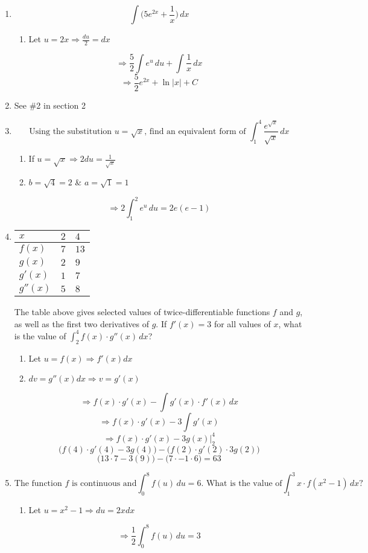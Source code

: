 \documentclass[12pt]{article}
\begin{document}
\begin{enumerate}
\item $$\int \bigg(5e^{2x}+\frac{1}{x}\bigg) \, dx$$
\begin{enumerate}
    \item Let $u=2x \Longrightarrow \frac{du}{2}=dx$
\end{enumerate}
$$\Longrightarrow \frac{5}{2}\int e^{u} \, du+ \int \frac{1}{x} \, dx$$
$$\Longrightarrow \frac{5}{2}e^{2x} + \ln|x| +C$$

\item See \#2 in section 2

\item $$ \text{Using the substitution $u=\sqrt{x}$, find an equivalent form of }\int_{1}^{4} \frac{e^{\sqrt{x}}}{\sqrt{x}} \, dx$$  
\begin{enumerate}
    \item If $u=\sqrt{x} \Longrightarrow 2du=\frac{1}{\sqrt{x}}$
    \item $b=\sqrt{4} = 2$ \& $a=\sqrt{1} = 1$
\end{enumerate}
$$\Longrightarrow 2\int_{1}^{2} e^u \, du = 2e(e-1)$$

 \item 

\begin{table}[h]
\begin{center}

\begin{tabular}{l|ll}
$x$ & $2$ & $4$ \\ \hline
$f(x)$ & $7$ & $13$ \\
$g(x)$ & $2$ & $9$ \\
$g'(x)$ & $1$ & $7$ \\
$g''(x)$ & $5$ & $8$
\end{tabular}
\end{center}
\end{table}
The table above gives selected values of twice-differentiable functions $f$ and $g$, as well as the first two derivatives of $g$. If $f'(x)=3$ for all values of $x$, what is the value of $\int_{2}^{4} f(x)\cdot g''(x) \, dx$?
\begin{enumerate}
    \item Let $u=f(x) \Longrightarrow f'(x)dx$
    \item $dv=g''(x)dx \Longrightarrow v=g'(x)$
\end{enumerate}
$$\Longrightarrow f(x)\cdot g'(x)-\int g'(x)\cdot f'(x) \, dx$$
$$\Longrightarrow f(x)\cdot g'(x)-3\int g'(x)$$
$$\Longrightarrow f(x)\cdot g'(x)-3g(x) \bigg\rvert_{2}^{4}$$
$$\bigg (f(4)\cdot g'(4)-3g(4) \bigg) - \bigg (f(2) \cdot g'(2)\cdot 3g(2) \bigg)$$
$$\bigg (13\cdot 7-3(9) \bigg) - \bigg (7 \cdot - 1\cdot 6 \bigg) = 63$$

\item $$\text{The function $f$ is continuous and}\int_{0}^{8} f(u)\,du=6 \text{. What is the value of}\int_{1}^{3} x \cdot f(x^2-1)\,dx \text{?}$$
\begin{enumerate}
    \item Let $u=x^2-1 \Longrightarrow du=2xdx$ 
\end{enumerate}
$$\Longrightarrow \frac{1}{2} \int^{8}_{0} f(u) \, du = 3$$
\end{enumerate}
\end{document}

